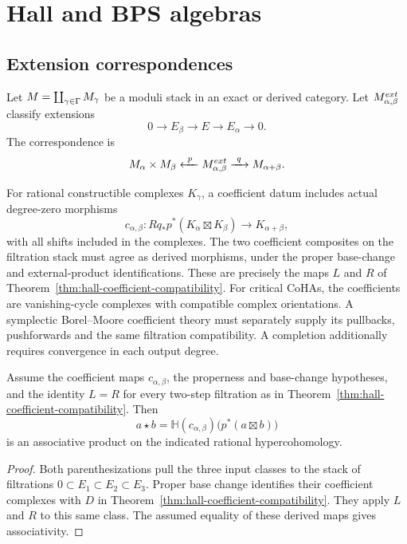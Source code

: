 \part{Hall and BPS algebras}

\chapter{Extension correspondences}
\label{ch:extension-correspondences}
Let $M=\coprod_{\gamma\in\Gamma}M_\gamma$ be a moduli stack in an exact or derived category. Let $M^{ext}_{\alpha,\beta}$ classify extensions
\[
 0\longrightarrow E_\beta\longrightarrow E\longrightarrow E_\alpha\longrightarrow0.
\]
The correspondence is
\[
 M_\alpha\times M_\beta
 \xleftarrow{\ p\ }
 M^{ext}_{\alpha,\beta}
 \xrightarrow{\ q\ }
 M_{\alpha+\beta}.
\]

For rational constructible complexes $K_\gamma$, a coefficient datum includes
actual degree-zero morphisms
\[
 c_{\alpha,\beta}:Rq_*p^*(K_\alpha\boxtimes K_\beta)
 \longrightarrow K_{\alpha+\beta},
\]
with all shifts included in the complexes. The two coefficient composites
on the filtration stack must agree as derived morphisms, under the proper
base-change and external-product identifications. These are precisely the
maps $L$ and $R$ of Theorem~\ref{thm:hall-coefficient-compatibility}.
For critical CoHAs, the coefficients are vanishing-cycle complexes with
compatible complex orientations. A symplectic Borel--Moore coefficient
theory must separately supply its pullbacks, pushforwards and the same
filtration compatibility. A completion additionally requires convergence
in each output degree.

\begin{theorem}
Assume the coefficient maps $c_{\alpha,\beta}$, the properness and
base-change hypotheses, and the identity $L=R$ for every two-step
filtration as in Theorem~\ref{thm:hall-coefficient-compatibility}. Then
\[
 a\star b=\mathbb H(c_{\alpha,\beta})\bigl(p^*(a\boxtimes b)\bigr)
\]
is an associative product on the indicated rational hypercohomology.
\end{theorem}
\begin{proof}
Both parenthesizations pull the three input classes to the stack of
filtrations $0\subset E_1\subset E_2\subset E_3$. Proper base change
identifies their coefficient complexes with $D$ in
Theorem~\ref{thm:hall-coefficient-compatibility}. They apply $L$ and $R$
to this same class. The assumed equality of these derived maps gives
associativity.
\end{proof}

